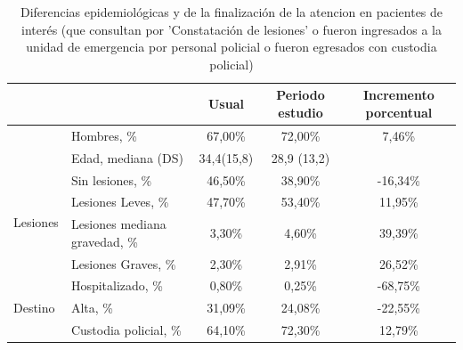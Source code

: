\documentclass{article}
\begin{document}
\begin{table}[H]
\begin{tabular}{@{}llccc@{}}
\toprule
                          &                               & \textbf{Usual} & \textbf{Periodo estudio} & \textbf{Incremento porcentual} \\ \midrule
                          & Hombres, \%                   & 67,00\%        & 72,00\%                  & 7,46\%                         \\
                          & Edad, mediana (DS)            & 34,4(15,8)     & 28,9 (13,2)              &                                \\ \cmidrule(l){1-5}
\multirow{4}{*}{Lesiones} & Sin lesiones, \%              & 46,50\%        & 38,90\%                  & -16,34\%                       \\ 
                          & Lesiones Leves, \%            & 47,70\%        & 53,40\%                  & 11,95\%                        \\
                          & Lesiones mediana gravedad, \% & 3,30\%         & 4,60\%                   & 39,39\%                        \\
                          & Lesiones Graves, \%           & 2,30\%         & 2,91\%                   & 26,52\%                        \\ \cmidrule(l){1-5}
\multirow{3}{*}{Destino}  & Hospitalizado,  \%            & 0,80\%         & 0,25\%                   & -68,75\%                       \\ 
                          & Alta, \%                      & 31,09\%        & 24,08\%                  & -22,55\%                       \\
                          & Custodia policial, \%         & 64,10\%        & 72,30\%                  & 12,79\%                        \\ \cmidrule(l){1-5} 
\end{tabular}
\caption{Diferencias epidemiológicas y de la finalización de la atencion en pacientes de interés (que consultan por 'Constatación de lesiones' o fueron ingresados a la unidad de emergencia por personal policial o fueron egresados con custodia policial)}
\end{table}
\end{document}
